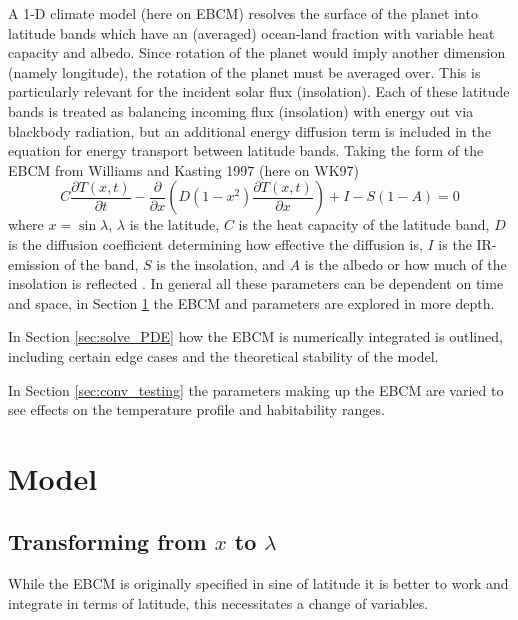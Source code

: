 \documentclass[12pt, onecolumn]{revtex4-2}    %
\begin{document}
A 1-D climate model (here on EBCM) resolves the surface of the planet into latitude bands which have an (averaged) ocean-land fraction with variable heat capacity and albedo.
Since rotation of the planet would imply another dimension (namely longitude), the rotation of the planet must be averaged over.
This is particularly relevant for the incident solar flux (insolation).
Each of these latitude bands is treated as balancing incoming flux (insolation) with energy out via blackbody radiation, but an additional energy diffusion term is included in the equation for energy transport between latitude bands.
Taking the form of the EBCM from Williams and Kasting 1997 (here on WK97)
\begin{equation}
    C\frac{\partial T(x, t)}{\partial t} - \frac{\partial}{\partial x} \left(D(1-x^2)\frac{\partial T(x, t)}{\partial x}\right) + I - S(1-A) = 0
    \label{eq:PDE_in_x}
\end{equation}
where $x=\sin\lambda$, $\lambda$ is the latitude, $C$ is the heat capacity of the latitude band,
$D$ is the diffusion coefficient determining how effective the diffusion is, $I$ is the IR-emission of the band,
$S$ is the insolation, and $A$ is the albedo or how much of the insolation is reflected \cite{WK97}.
In general all these parameters can be dependent on time and space, in Section \ref{sec:model} the EBCM and parameters are explored in more depth.

In Section \ref{sec:solve_PDE} how the EBCM is numerically integrated is outlined, including certain edge cases and the theoretical stability of the model.

In Section \ref{sec:conv_testing} the parameters making up the EBCM are varied to see effects on the temperature profile and habitability ranges.

\section{Model} \label{sec:model}

\subsection{Transforming from $x$ to $\lambda$}

While the EBCM is originally specified in sine of latitude it is better to work and integrate in terms of latitude, this necessitates a change of variables.
\end{document}
